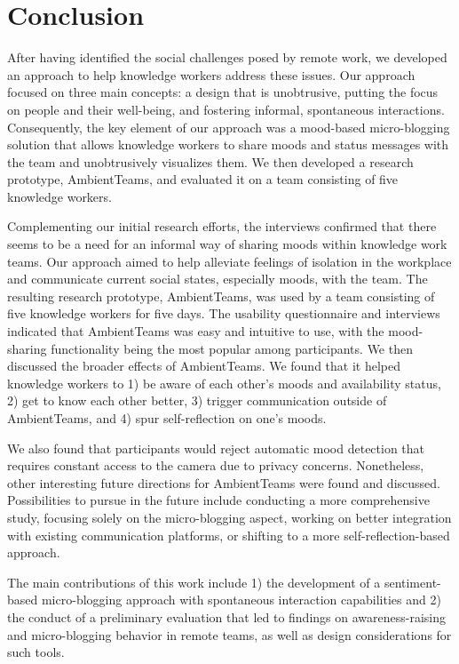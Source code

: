 \chapter{Conclusion}
\label{chapter:conclusion}
After having identified the social challenges posed by remote work, we developed an approach to help knowledge workers address these issues. Our approach focused on three main concepts: a design that is unobtrusive, putting the focus on people and their well-being, and fostering informal, spontaneous interactions. Consequently, the key element of our approach was a mood-based micro-blogging solution that allows knowledge workers to share moods and status messages with the team and unobtrusively visualizes them. We then developed a research prototype, AmbientTeams, and evaluated it on a team consisting of five knowledge workers.

Complementing our initial research efforts, the interviews confirmed that there seems to be a need for an informal way of sharing moods within knowledge work teams. Our approach aimed to help alleviate feelings of isolation in the workplace and communicate current social states, especially moods, with the team. The resulting research prototype, AmbientTeams, was used by a team consisting of five knowledge workers for five days. The usability questionnaire and interviews indicated that AmbientTeams was easy and intuitive to use, with the mood-sharing functionality being the most popular among participants. We then discussed the broader effects of AmbientTeams. We found that it helped knowledge workers to 1) be aware of each other's moods and availability status, 2) get to know each other better, 3) trigger communication outside of AmbientTeams, and 4) spur self-reflection on one's moods.

We also found that participants would reject automatic mood detection that requires constant access to the camera due to privacy concerns. Nonetheless, other interesting future directions for AmbientTeams were found and discussed. Possibilities to pursue in the future include conducting a more comprehensive study, focusing solely on the micro-blogging aspect, working on better integration with existing communication platforms, or shifting to a more self-reflection-based approach.

The main contributions of this work include 1) the development of a sentiment-based micro-blogging approach with spontaneous interaction capabilities and 2) the conduct of a preliminary evaluation that led to findings on awareness-raising and micro-blogging behavior in remote teams, as well as design considerations for such tools.
